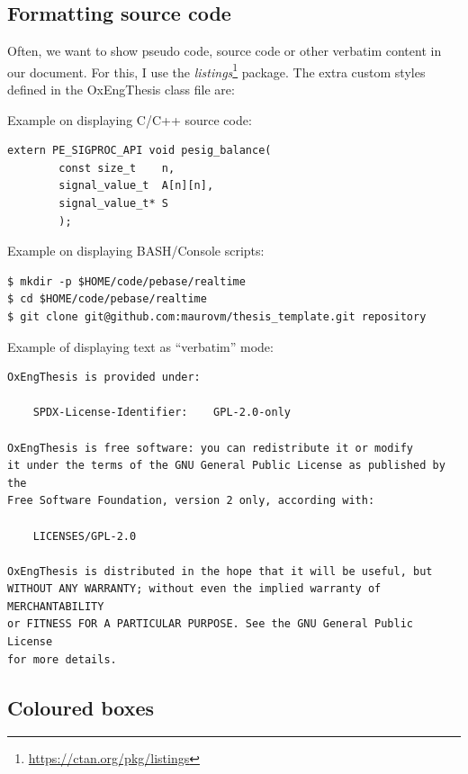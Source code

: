 \subsection{Formatting source code}


Often, we want to show pseudo code, source code or other verbatim content in our document. For this, I use the \textit{listings}\footnote{\url{https://ctan.org/pkg/listings}} package. The extra custom styles defined in the OxEngThesis class file are:


Example on displaying C/C++ source code:


\begin{lstlisting}[style=custom-c,caption={Function to balance a matrix.}]
extern PE_SIGPROC_API void pesig_balance(
        const size_t    n,
        signal_value_t  A[n][n],
        signal_value_t* S
        );
\end{lstlisting}


Example on displaying BASH/Console scripts:


\begin{lstlisting}[style=custom-bash,caption={A script in bash.}]
$ mkdir -p $HOME/code/pebase/realtime
$ cd $HOME/code/pebase/realtime
$ git clone git@github.com:maurovm/thesis_template.git repository
\end{lstlisting}


Example of displaying text as ``verbatim'' mode:


\begin{lstlisting}[style=custom-verbatim,caption={License information.}]
OxEngThesis is provided under:

    SPDX-License-Identifier:    GPL-2.0-only
    
OxEngThesis is free software: you can redistribute it or modify
it under the terms of the GNU General Public License as published by the
Free Software Foundation, version 2 only, according with:

    LICENSES/GPL-2.0

OxEngThesis is distributed in the hope that it will be useful, but
WITHOUT ANY WARRANTY; without even the implied warranty of MERCHANTABILITY
or FITNESS FOR A PARTICULAR PURPOSE. See the GNU General Public License
for more details.
\end{lstlisting}


\subsection{Coloured boxes}


